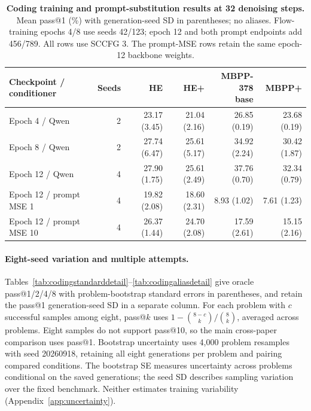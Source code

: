 \documentclass{article}
\begin{document}
\begin{table}[htbp]
\centering\small
\setlength{\tabcolsep}{4pt}
\caption{\textbf{Coding training and prompt-substitution results at 32 denoising steps.} Mean pass@1 (\%) with generation-seed SD in parentheses; no aliases. Flow-training epochs 4/8 use seeds 42/123; epoch 12 and both prompt endpoints add 456/789. All rows use SCCFG 3. The prompt-MSE rows retain the same epoch-12 backbone weights.}
\label{tab:codingstages}
\begin{tabular}{@{}lrrrrr@{}}
\toprule
Checkpoint / conditioner & Seeds & HE & HE+ & \shortstack{MBPP-378\\base} & MBPP+\\
\midrule
Epoch 4 / Qwen & 2 & 23.17 {\scriptsize (3.45)} & 21.04 {\scriptsize (2.16)} & 26.85 {\scriptsize (0.19)} & 23.68 {\scriptsize (0.19)}\\
Epoch 8 / Qwen & 2 & 27.74 {\scriptsize (6.47)} & 25.61 {\scriptsize (5.17)} & 34.92 {\scriptsize (2.24)} & 30.42 {\scriptsize (1.87)}\\
Epoch 12 / Qwen & 4 & 27.90 {\scriptsize (1.75)} & 25.61 {\scriptsize (2.49)} & 37.76 {\scriptsize (0.70)} & 32.34 {\scriptsize (0.79)}\\
Epoch 12 / prompt MSE 1 & 4 & 19.82 {\scriptsize (2.08)} & 18.60 {\scriptsize (2.31)} & 8.93 {\scriptsize (1.02)} & 7.61 {\scriptsize (1.23)}\\
Epoch 12 / prompt MSE 10 & 4 & 26.37 {\scriptsize (1.44)} & 24.70 {\scriptsize (2.08)} & 17.59 {\scriptsize (2.61)} & 15.15 {\scriptsize (2.16)}\\
\bottomrule
\end{tabular}
\end{table}

\paragraph{Eight-seed variation and multiple attempts.}
Tables~\ref{tab:codingstandarddetail}--\ref{tab:codingaliasdetail} give oracle pass@1/2/4/8 with problem-bootstrap standard errors in parentheses, and retain the pass@1 generation-seed SD in a separate column. For each problem with $c$ successful samples among eight, pass@$k$ uses $1-\binom{8-c}{k}/\binom{8}{k}$, averaged across problems. Eight samples do not support pass@10, so the main cross-paper comparison uses pass@1. Bootstrap uncertainty uses 4,000 problem resamples with seed 20260918, retaining all eight generations per problem and pairing compared conditions. The bootstrap SE measures uncertainty across problems conditional on the saved generations; the seed SD describes sampling variation over the fixed benchmark. Neither estimates training variability (Appendix~\ref{app:uncertainty}).
\end{document}
